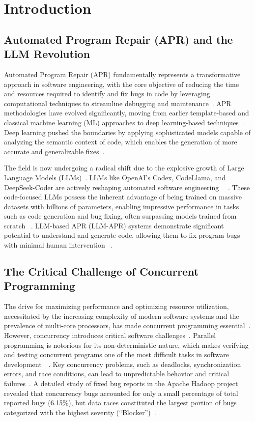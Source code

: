 \section{Introduction}

\subsection{Automated Program Repair (APR) and the LLM Revolution}

Automated Program Repair (APR) fundamentally represents a transformative approach in software engineering, with the core objective of reducing the time and resources required to identify and fix bugs in code by leveraging computational techniques to streamline debugging and maintenance~\cite{dikici2025}. APR methodologies have evolved significantly, moving from earlier template-based and classical machine learning (ML) approaches to deep learning-based techniques~\cite{dikici2025}. Deep learning pushed the boundaries by applying sophisticated models capable of analyzing the semantic context of code, which enables the generation of more accurate and generalizable fixes~\cite{dikici2025}.

The field is now undergoing a radical shift due to the explosive growth of Large Language Models (LLMs)~\cite{yang2025}. LLMs like OpenAI’s Codex, CodeLlama, and DeepSeek-Coder are actively reshaping automated software engineering ~\cite{yang2025}~\cite{anand2024}. These code-focused LLMs possess the inherent advantage of being trained on massive datasets with billions of parameters, enabling impressive performance in tasks such as code generation and bug fixing, often surpassing models trained from scratch ~\cite{anand2024}. LLM-based APR (LLM-APR) systems demonstrate significant potential to understand and generate code, allowing them to fix program bugs with minimal human intervention ~\cite{yang2025}.

\subsection{The Critical Challenge of Concurrent Programming}

The drive for maximizing performance and optimizing resource utilization, necessitated by the increasing complexity of modern software systems and the prevalence of multi-core processors, has made concurrent programming essential~\cite{jain2025}. However, concurrency introduces critical software challenges~\cite{jain2025}. Parallel programming is notorious for its non-deterministic nature, which makes verifying and testing concurrent programs one of the most difficult tasks in software development~\cite{jain2025}~\cite{chang2021}. Key concurrency problems, such as deadlocks, synchronization errors, and race conditions, can lead to unpredictable behavior and critical failures~\cite{jain2025}. A detailed study of fixed bug reports in the Apache Hadoop project revealed that concurrency bugs accounted for only a small percentage of total reported bugs (6.15\%), but data races constituted the largest portion of bugs categorized with the highest severity (“Blocker”)~\cite{abbaspour2016}.

